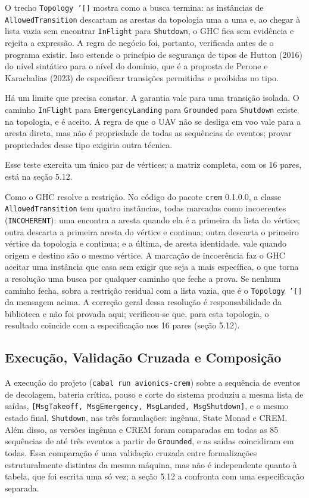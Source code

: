 \documentclass[12pt,a4paper]{article}
\begin{document}
O trecho \texttt{Topology '[]} mostra como a busca termina: as instâncias de \texttt{AllowedTransition} descartam as arestas da topologia uma a uma e, ao chegar à lista vazia sem encontrar \texttt{InFlight} para \texttt{Shutdown}, o GHC fica sem evidência e rejeita a expressão. A regra de negócio foi, portanto, verificada antes de o programa existir. Isso estende o princípio de segurança de tipos de Hutton (2016) do nível sintático para o nível do domínio, que é a proposta de Perone e Karachalias (2023) de especificar transições permitidas e proibidas no tipo.

Há um limite que precisa constar. A garantia vale para uma transição isolada. O caminho \texttt{InFlight} para \texttt{EmergencyLanding} para \texttt{Grounded} para \texttt{Shutdown} existe na topologia, e é aceito. A regra de que o UAV não se desliga em voo vale para a aresta direta, mas não é propriedade de todas as sequências de eventos; provar propriedades desse tipo exigiria outra técnica.

Esse teste exercita um único par de vértices; a matriz completa, com os 16 pares, está na seção 5.12.

Como o GHC resolve a restrição. No código do pacote \texttt{crem} 0.1.0.0, a classe \texttt{AllowedTransition} tem quatro instâncias, todas marcadas como incoerentes (\texttt{INCOHERENT}): uma encontra a aresta quando ela é a primeira da lista do vértice; outra descarta a primeira aresta do vértice e continua; outra descarta o primeiro vértice da topologia e continua; e a última, de aresta identidade, vale quando origem e destino são o mesmo vértice. A marcação de incoerência faz o GHC aceitar uma instância que casa sem exigir que seja a mais específica, o que torna a resolução uma busca por qualquer caminho que feche a prova. Se nenhum caminho fecha, sobra a restrição residual com a lista vazia, que é o \texttt{Topology '[]} da mensagem acima. A correção geral dessa resolução é responsabilidade da biblioteca e não foi provada aqui; verificou-se que, para esta topologia, o resultado coincide com a especificação nos 16 pares (seção 5.12).

\subsection{Execução, Validação Cruzada e Composição}

A execução do projeto (\texttt{cabal run avionics-crem}) sobre a sequência de eventos de decolagem, bateria crítica, pouso e corte do sistema produziu a mesma lista de saídas, \texttt{[MsgTakeoff, MsgEmergency, MsgLanded, MsgShutdown]}, e o mesmo estado final, \texttt{Shutdown}, nas três formulações: ingênua, State Monad e CREM. Além disso, as versões ingênua e CREM foram comparadas em todas as 85 sequências de até três eventos a partir de \texttt{Grounded}, e as saídas coincidiram em todas. Essa comparação é uma validação cruzada entre formalizações estruturalmente distintas da mesma máquina, mas não é independente quanto à tabela, que foi escrita uma só vez; a seção 5.12 a confronta com uma especificação separada.
\end{document}

